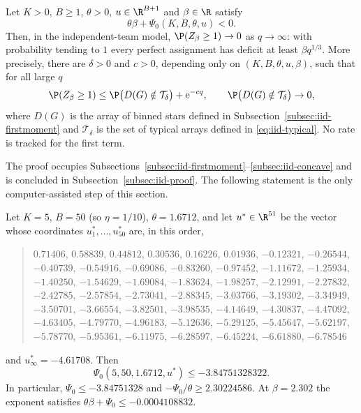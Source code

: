\begin{proposition}\label{prop:iid-criterion}
Let $K>0$, $B\ge1$, $\theta>0$, $u\in\R^{B+1}$ and $\beta\in\R$ satisfy
\begin{equation}\label{eq:iid-criterion}
\theta\beta+\Psi_0(K,B,\theta,u)<0 .
\end{equation}
Then, in the independent-team model, $\P(Z_\beta\ge1)\to0$ as $q\to\infty$: with
probability tending to $1$ every perfect assignment has deficit at least $\beta q^{1/3}$.
More precisely, there are $\delta>0$ and $c>0$, depending only on $(K,B,\theta,u,\beta)$,
such that for all large $q$
\[
\P(Z_\beta\ge1)\le\P\bigl(D(G)\notin\mathcal{T}_\delta\bigr)+\mathrm{e}^{-cq},
\qquad \P\bigl(D(G)\notin\mathcal{T}_\delta\bigr)\to0,
\]
where $D(G)$ is the array of binned stars defined in
Subsection~\ref{subsec:iid-firstmoment} and $\mathcal{T}_\delta$ is the set of typical
arrays defined in \eqref{eq:iid-typical}. No rate is tracked for the first term.
\end{proposition}

The proof occupies Subsections~\ref{subsec:iid-firstmoment}--\ref{subsec:iid-concave} and
is concluded in Subsection~\ref{subsec:iid-proof}. The following statement is the only
computer-assisted step of this section.

\begin{proposition}\label{prop:iid-certificate}
Let $K=5$, $B=50$ (so $\eta=1/10$), $\theta=1.6712$, and let $u^\ast\in\R^{51}$ be the
vector whose coordinates $u^\ast_1,\dots,u^\ast_{50}$ are, in this order,
\begin{quote}\small\raggedright
$0.71406$, $0.58839$, $0.44812$, $0.30536$, $0.16226$, $0.01936$, $-0.12321$,
$-0.26544$, $-0.40739$, $-0.54916$, $-0.69086$, $-0.83260$, $-0.97452$, $-1.11672$,
$-1.25934$, $-1.40250$, $-1.54629$, $-1.69084$, $-1.83624$, $-1.98257$, $-2.12991$,
$-2.27832$, $-2.42785$, $-2.57854$, $-2.73041$, $-2.88345$, $-3.03766$, $-3.19302$,
$-3.34949$, $-3.50701$, $-3.66554$, $-3.82501$, $-3.98535$, $-4.14649$, $-4.30837$,
$-4.47092$, $-4.63405$, $-4.79770$, $-4.96183$, $-5.12636$, $-5.29125$, $-5.45647$,
$-5.62197$, $-5.78770$, $-5.95361$, $-6.11975$, $-6.28597$, $-6.45224$, $-6.61880$,
$-6.78546$
\end{quote}
and $u^\ast_\infty=-4.61708$. Then
\begin{equation}\label{eq:iid-psi0-certified}
\Psi_0(5,50,1.6712,u^\ast)\le-3.84751328322 .
\end{equation}
In particular, $\Psi_0\le-3.84751328$ and $-\Psi_0/\theta\ge2.30224586$.
At $\beta=2.302$ the exponent satisfies $\theta\beta+\Psi_0\le-0.0004108832$.
\end{proposition}

